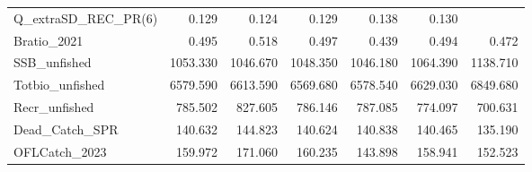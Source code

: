 \documentclass[11pt,
  english,
]{article}
\begin{document}
\begin{landscape}
\begin{table}
\begin{tabular}[t]{lrrrrrr}
Q\_extraSD\_REC\_PR(6) & 0.129 & 0.124 & 0.129 & 0.138 & 0.130 & \\
Bratio\_2021 & 0.495 & 0.518 & 0.497 & 0.439 & 0.494 & 0.472\\
SSB\_unfished & 1053.330 & 1046.670 & 1048.350 & 1046.180 & 1064.390 & 1138.710\\
Totbio\_unfished & 6579.590 & 6613.590 & 6569.680 & 6578.540 & 6629.030 & 6849.680\\
Recr\_unfished & 785.502 & 827.605 & 786.146 & 787.085 & 774.097 & 700.631\\
Dead\_Catch\_SPR & 140.632 & 144.823 & 140.624 & 140.838 & 140.465 & 135.190\\
OFLCatch\_2023 & 159.972 & 171.060 & 160.235 & 143.898 & 158.941 & 152.523\\
\bottomrule
\end{tabular}
\end{table}
\end{landscape}
\end{document}
